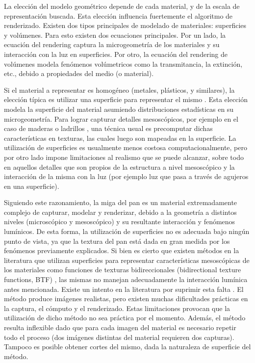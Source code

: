\documentclass[spanish,a4paper,openright,11pt]{book}
\begin{document}
La elección del modelo geométrico depende de cada material, y de la escala de representación buscada.
Esta elección influencia fuertemente el algoritmo de renderizado. 
Existen dos tipos principales de modelado de materiales: superficies y volúmenes.
Para esto existen dos ecuaciones principales.
Por un lado, la ecuación del rendering \cite{Kajiya1986} captura la microgeometría de los materiales y su interacción con la luz en superficies.
Por otro, la ecuación del rendering de volúmenes \cite{Kajiya1984} modela fenómenos volúmetricos como la transmitancia, la extinción, etc., debido a propiedades del medio (o material).

Si el material a representar es homogéneo (metales, plásticos, y similares), la elección típica es utilizar una superficie para representar el mismo \cite{Neumann1999}.
Esta elección modela la superficie del material asumiendo distribuciones estadísticas en su microgeometría.
Para lograr capturar detalles mesoscópicos, por ejemplo en el caso de maderas o ladrillos \cite{Lefebvre2000}, una técnica usual es precomputar dichas características en texturas, las cuales luego son mapeadas en la superficie.
La utilización de superficies es usualmente menos costosa computacionalmente, pero por otro lado impone limitaciones al realismo que se puede alcanzar, sobre todo en aquellos detalles que son propios de la estructura a nivel mesoscópico y la interacción de la misma con la luz (por ejemplo luz que pasa a través de agujeros en una superficie).

Siguiendo este razonamiento, la miga del pan es un material extremadamente complejo de capturar, modelar y renderizar, debido a la geometría a distintos niveles (microscópico y mesoscópico) y su resultante interacción y fenómenos lumínicos.
De esta forma, la utilización de superficies no es adecuada bajo ningún punto de vista, ya que la textura del pan está dada en gran medida por los fenómenos previamente explicados.
Si bien es cierto que existen métodos en la literatura que utilizan superficies para representar características mesoscópicas de los materiales como funciones de texturas bidireccionales (bidirectional texture functions, BTF) \cite{Tong2002}, las mismas no manejan adecuadamente la interacción lumínica antes mencionada.
Existe un intento en la literatura por suprimir esta falta \cite{Tong2005}.
El método produce imágenes realistas, pero existen muchas dificultades prácticas en la captura, el cómputo y el renderizado.
Estas limitaciones provocan que la utilización de dicho método no sea práctica por el momento.
Además, el método resulta inflexible dado que para cada imagen del material es necesario repetir todo el proceso (dos imágenes distintas del material requieren dos capturas).
Tampoco es posible obtener cortes del mismo, dada la naturaleza de superficie del método.
\end{document}
